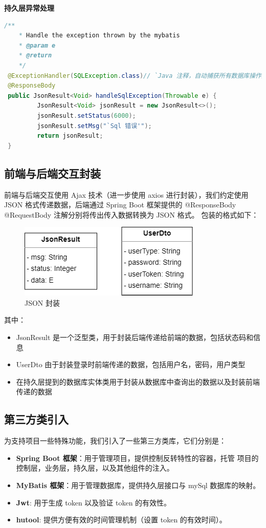 \documentclass[12pt, a4paper]{article}
\begin{document}
\textbf{持久层异常处理}
\begin{lstlisting}[language=Java]
	/**
	* Handle the exception thrown by the mybatis
	* @param e
	* @return
	*/
 @ExceptionHandler(SQLException.class)// `Java 注释，自动捕获所有数据库操作异常'
 @ResponseBody
 public JsonResult<Void> handleSqlException(Throwable e) {
		 JsonResult<Void> jsonResult = new JsonResult<>();
		 jsonResult.setStatus(6000);
		 jsonResult.setMsg("`Sql 错误'");
		 return jsonResult;
 }
\end{lstlisting}


\subsection{前端与后端交互封装}
前端与后端交互使用 Ajax 技术（进一步使用 axios 进行封装），我们约定使用 JSON 格式传递数据，后端通过 Spring Boot
框架提供的 @ResponseBody @RequestBody 注解分别将传出传入数据转换为 JSON 格式。
包装的格式如下：
\begin{figure}[H]
  \centering
  \includegraphics[width = 0.4 \textwidth]{Json.png}
  \caption{JSON 封装}
\end{figure}
其中：
\begin{itemize}
  \item JsonResult 是一个泛型类，用于封装后端传递给前端的数据，包括状态码和信息
  \item UserDto 由于封装登录时前端传递的数据，包括用户名，密码，用户类型
  \item 在持久层提到的数据库实体类用于封装从数据库中查询出的数据以及封装前端传递的数据
\end{itemize}

\subsection{第三方类引入}
为支持项目一些特殊功能，我们引入了一些第三方类库，它们分别是：
\begin{itemize}
  \item \textbf{Spring Boot 框架}：用于管理项目，提供控制反转特性的容器，托管
        项目的控制层，业务层，持久层，以及其他组件的注入。
  \item \textbf{MyBatis 框架}：用于管理数据库，提供持久层接口与 mySql 数据库的映射。
  \item \textbf{Jwt}: 用于生成 token 以及验证 token 的有效性。
  \item \textbf{hutool}: 提供方便有效的时间管理机制（设置 token 的有效时间）。

\end{itemize}
\end{document}
